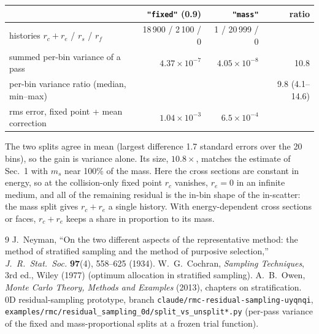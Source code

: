 \documentclass[11pt]{article}
\begin{document}
\begin{center}
\begin{tabular}{lrrr}
\toprule
 & \texttt{"fixed"} (0.9) & \texttt{"mass"} & ratio \\
\midrule
histories $r_c+r_e$ / $r_s$ / $r_f$ & 18\,900 / 2\,100 / 0 & 1 / 20\,999 / 0 & \\
summed per-bin variance of a pass & $4.37\times10^{-7}$ & $4.05\times10^{-8}$ & 10.8 \\
per-bin variance ratio (median, min--max) & & & 9.8 (4.1--14.6) \\
rms error, fixed point + mean correction & $1.04\times10^{-3}$ & $6.5\times10^{-4}$ & \\
\bottomrule
\end{tabular}
\end{center}
\noindent The two splits agree in mean (largest difference 1.7 standard errors over the
20 bins), so the gain is variance alone. Its size, $10.8\times$, matches the estimate
of Sec.~1 with $m_s$ near 100\% of the mass. Here the cross sections are constant in
energy, so at the collision-only fixed point $r_c$ vanishes, $r_e = 0$ in an infinite
medium, and all of the remaining residual is the in-bin shape of the in-scatter: the
mass split gives $r_c+r_e$ a single history. With energy-dependent cross sections or
faces, $r_c+r_e$ keeps a share in proportion to its mass.

\begin{thebibliography}{9}
 J.~Neyman, ``On the two different aspects of the representative
  method: the method of stratified sampling and the method of purposive selection,''
  \emph{J.\ R.\ Stat.\ Soc.} \textbf{97}(4), 558--625 (1934).
 W.~G.~Cochran, \emph{Sampling Techniques}, 3rd ed., Wiley (1977)
  (optimum allocation in stratified sampling).
 A.~B.~Owen, \emph{Monte Carlo Theory, Methods and Examples} (2013),
  chapters on stratification.
 0D residual-sampling prototype, branch
  \texttt{claude/rmc-residual-sampling-uyqnqi},
  \texttt{examples/rmc/residual\_sampling\_0d/split\_vs\_unsplit*.py} (per-pass
  variance of the fixed and mass-proportional splits at a frozen trial function).
\end{thebibliography}
\end{document}
